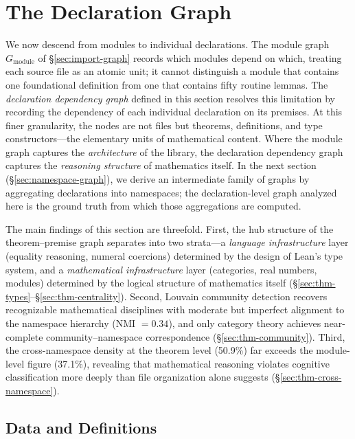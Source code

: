 \section{The Declaration Graph}
\label{sec:theorem-premise}

We now descend from modules to individual declarations. The module graph $G_{\mathrm{module}}$ of \S\ref{sec:import-graph} records which modules depend on which, treating each source file as an atomic unit; it cannot distinguish a module that contains one foundational definition from one that contains fifty routine lemmas. The \emph{declaration dependency graph} defined in this section resolves this limitation by recording the dependency of each individual declaration on its premises. At this finer granularity, the nodes are not files but theorems, definitions, and type constructors---the elementary units of mathematical content. Where the module graph captures the \emph{architecture} of the library, the declaration dependency graph captures the \emph{reasoning structure} of mathematics itself. In the next section (\S\ref{sec:namespace-graph}), we derive an intermediate family of graphs by aggregating declarations into namespaces; the declaration-level graph analyzed here is the ground truth from which those aggregations are computed.

The main findings of this section are threefold. First, the hub structure of the theorem--premise graph separates into two strata---a \emph{language infrastructure} layer (equality reasoning, numeral coercions) determined by the design of Lean's type system, and a \emph{mathematical infrastructure} layer (categories, real numbers, modules) determined by the logical structure of mathematics itself (\S\ref{sec:thm-types}--\S\ref{sec:thm-centrality}). Second, Louvain community detection recovers recognizable mathematical disciplines with moderate but imperfect alignment to the namespace hierarchy (NMI $= 0.34$), and only category theory achieves near-complete community--namespace correspondence (\S\ref{sec:thm-community}). Third, the cross-namespace density at the theorem level (50.9\%) far exceeds the module-level figure (37.1\%), revealing that mathematical reasoning violates cognitive classification more deeply than file organization alone suggests (\S\ref{sec:thm-cross-namespace}).

\subsection{Data and Definitions}
\label{sec:thm-data}

